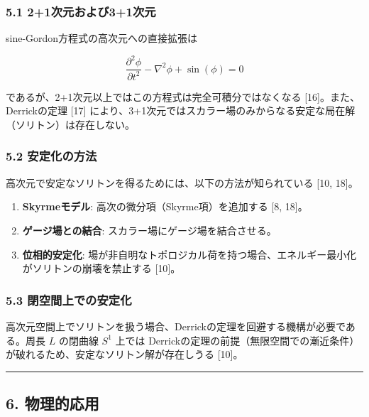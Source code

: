 \documentclass[a4paper,11pt]{ltjsarticle}
\providecommand{\tightlist}{\setlength{\itemsep}{0pt}\setlength{\parskip}{0pt}}
\begin{document}
\subsubsection{5.1
2+1次元および3+1次元}\label{ux6b21ux5143ux304aux3088ux307331ux6b21ux5143}

sine-Gordon方程式の高次元への直接拡張は

\[\frac{\partial^2\phi}{\partial t^2} - \nabla^2\phi + \sin(\phi) = 0\]

であるが、2+1次元以上ではこの方程式は完全可積分ではなくなる
{[}16{]}。また、Derrickの定理 {[}17{]}
により、3+1次元ではスカラー場のみからなる安定な局在解（ソリトン）は存在しない。

\subsubsection{5.2
安定化の方法}\label{ux5b89ux5b9aux5316ux306eux65b9ux6cd5}

高次元で安定なソリトンを得るためには、以下の方法が知られている {[}10,
18{]}。

\begin{enumerate}
\def\labelenumi{\arabic{enumi}.}
\tightlist
\item
  \textbf{Skyrmeモデル}: 高次の微分項（Skyrme項）を追加する {[}8,
  18{]}。
\item
  \textbf{ゲージ場との結合}: スカラー場にゲージ場を結合させる。
\item
  \textbf{位相的安定化}:
  場が非自明なトポロジカル荷を持つ場合、エネルギー最小化がソリトンの崩壊を禁止する
  {[}10{]}。
\end{enumerate}

\subsubsection{5.3
閉空間上での安定化}\label{ux9589ux7a7aux9593ux4e0aux3067ux306eux5b89ux5b9aux5316}

高次元空間上でソリトンを扱う場合、Derrickの定理を回避する機構が必要である。周長
\(L\) の閉曲線 \(S^1\) 上では
Derrickの定理の前提（無限空間での漸近条件）が破れるため、安定なソリトン解が存在しうる
{[}10{]}。

\begin{center}\rule{0.5\linewidth}{0.5pt}\end{center}

\subsection{6. 物理的応用}\label{ux7269ux7406ux7684ux5fdcux7528}
\end{document}
